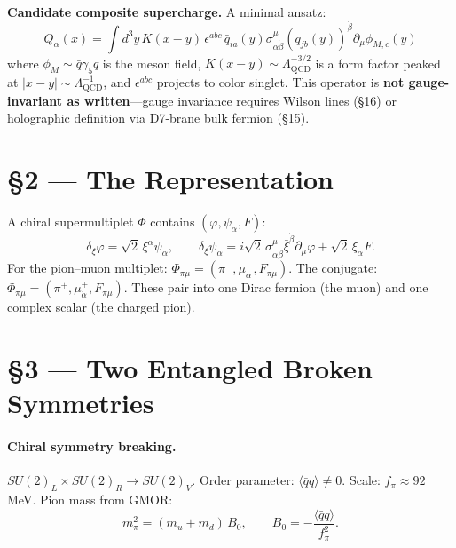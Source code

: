 \documentclass[11pt,a4paper]{article}
\newcommand{\Lqcd}{\Lambda_{\text{QCD}}}
\newcommand{\fpi}{f_\pi}
\newcommand{\mpi}{m_\pi}
\newcommand{\qqbar}{\langle\bar{q}q\rangle}
\begin{document}
\textbf{Candidate composite supercharge.}  A minimal ansatz:
\begin{equation}
Q_\alpha(x) = \int d^3y\, K(x{-}y)\, \epsilon^{abc}\,\bar{q}_{ia}(y) \sigma^{\mu}_{\alpha\dot{\beta}} (q_{jb}(y))^{\dot{\beta}} \partial_\mu\phi_{M,c}(y)
\end{equation}
where $\phi_M \sim \bar{q}\gamma_5 q$ is the meson field, $K(x{-}y) \sim \Lqcd^{-3/2}$ is a form factor peaked at $|x{-}y| \sim \Lqcd^{-1}$, and $\epsilon^{abc}$ projects to color singlet.  This operator is \textbf{not gauge-invariant as written}---gauge invariance requires Wilson lines (\S 16) or holographic definition via D7-brane bulk fermion (\S 15).

\section*{\S 2 --- The Representation}

A chiral supermultiplet $\Phi$ contains $(\varphi, \psi_\alpha, F)$:
\begin{equation}
\delta_\xi \varphi = \sqrt{2}\,\xi^\alpha\psi_\alpha, \qquad \delta_\xi \psi_\alpha = i\sqrt{2}\,\sigma^\mu_{\alpha\dot{\beta}}\bar{\xi}^{\dot{\beta}}\partial_\mu\varphi + \sqrt{2}\,\xi_\alpha F.
\end{equation}
For the pion--muon multiplet: $\Phi_{\pi\mu} = (\pi^-, \mu^-_\alpha, F_{\pi\mu})$.  The conjugate: $\bar{\Phi}_{\pi\mu} = (\pi^+, \mu^+_{\dot{\alpha}}, \bar{F}_{\pi\mu})$.  These pair into one Dirac fermion (the muon) and one complex scalar (the charged pion).

\section*{\S 3 --- Two Entangled Broken Symmetries}

\paragraph{Chiral symmetry breaking.}
$SU(2)_L \times SU(2)_R \to SU(2)_V$.  Order parameter: $\qqbar \neq 0$.  Scale: $\fpi \approx 92$ MeV.  Pion mass from GMOR:
\begin{equation}
\mpi^2 = (m_u + m_d)\,B_0, \qquad B_0 = -\frac{\qqbar}{\fpi^2}.
\end{equation}
\end{document}
